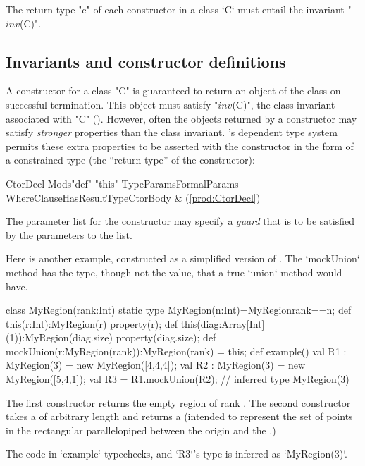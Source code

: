 The return type \xcd"c" of each constructor in a class \xcd`C`
must entail the invariant \xcdmath"$\mathit{inv}$(C)".


\subsection{Invariants and constructor definitions}

A constructor for a class \xcd"C" is guaranteed to return an object of the
class on successful termination. This object must satisfy  \xcdmath"$\mathit{inv}$(C)", the
class invariant associated with \xcd"C" ().
However,
often the objects returned by a constructor may satisfy {\em stronger}
properties than the class invariant. \Xten{}'s dependent type system
permits these extra properties to be asserted with the constructor in
the form of a constrained type (the ``return type'' of the constructor):

\begin{bbgrammar}
            CtorDecl \: Mods\opt \xcd"def" \xcd"this" TypeParams\opt FormalParams WhereClause\opt HasResultType\opt  CtorBody & (\ref{prod:CtorDecl}) \\
\end{bbgrammar}

\label{ConstructorGuard}

The parameter list for the constructor
may specify a \emph{guard} that is to be satisfied by the parameters
to the list.

\begin{ex}
Here is another example, constructed as a simplified 
version of .  The \xcd`mockUnion` method 
has the type, though not the value, that a true \xcd`union` method would have.

\begin{xten}
class MyRegion(rank:Int) {
  static type MyRegion(n:Int)=MyRegion{rank==n};
  def this(r:Int):MyRegion(r) {
    property(r);
  }
  def this(diag:Array[Int](1)):MyRegion(diag.size){ 
    property(diag.size);
  }
  def mockUnion(r:MyRegion(rank)):MyRegion(rank) = this;
  def example() {
    val R1 : MyRegion(3) = new MyRegion([4,4,4]); 
    val R2 : MyRegion(3) = new MyRegion([5,4,1]); 
    val R3 = R1.mockUnion(R2); // inferred type MyRegion(3)
  }
}
\end{xten}
%
The first constructor returns the empty region of rank .  The
second constructor takes a  of arbitrary length
 and returns a  (intended to represent the set
of points in the rectangular parallelopiped between the origin and the
.)

The code in \xcd`example` typechecks, and \xcd`R3`'s type is inferred as
\xcd`MyRegion(3)`.  


\end{ex}

